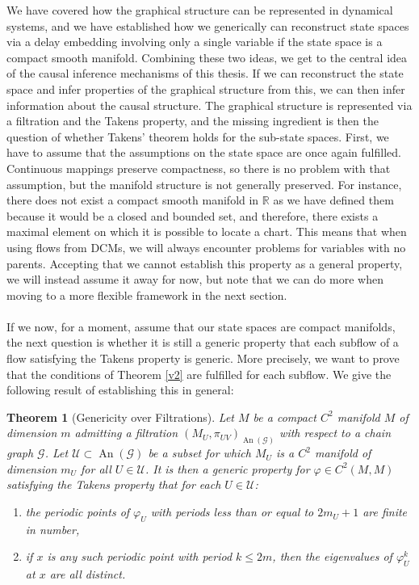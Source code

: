 \documentclass[11pt, a4paper]{memoir}
\theoremstyle{break}
\newtheorem{thm}{Theorem}
\theoremstyle{break}
\theoremstyle{nonumberplain}
\newcommand{\mR}{\mathbb{R}}
\DeclareMathOperator{\an}{An}
\begin{document}
We have covered how the graphical structure can be represented in dynamical systems, and we have established how we generically can reconstruct state spaces via a delay embedding involving only a single variable if the state space is a compact smooth manifold. Combining these two ideas, we get to the central idea of the causal inference mechanisms of this thesis. If we can reconstruct the state space and infer properties of the graphical structure from this, we can then infer information about the causal structure. The graphical structure is represented via a filtration and the Takens property, and the missing ingredient is then the question of whether Takens' theorem holds for the sub-state spaces. First, we have to assume that the assumptions on the state space are once again fulfilled. Continuous mappings preserve compactness, so there is no problem with that assumption, but the manifold structure is not generally preserved. For instance, there does not exist a compact smooth manifold in $\mR$ as we have defined them because it would be a closed and bounded set, and therefore, there exists a maximal element on which it is possible to locate a chart. This means that when using flows from DCMs, we will always encounter problems for variables with no parents. Accepting that we cannot establish this property as a general property, we will instead assume it away for now, but note that we can do more when moving to a more flexible framework in the next section.\\\\
If we now, for a moment, assume that our state spaces are compact manifolds, the next question is whether it is still a generic property that each subflow of a flow satisfying the Takens property is generic. More precisely, we want to prove that the conditions of Theorem \ref{v2} are fulfilled for each subflow. We give the following result of \cite{mathFound} establishing this in general:
\begin{thm}[Genericity over Filtrations]\label{tech}
Let $M$ be a compact $C^2$ manifold $M$ of dimension $m$ admitting a filtration $(M_U,\pi_{UV})_{\an(\mathcal{G})}$ with respect to a chain graph $\mathcal{G}$. Let $\mathcal{U}\subset \an(\mathcal{G})$ be a subset for which $M_U$ is a $C^2$ manifold of dimension $m_U$ for all $U\in \mathcal{U}$. It is then a generic property for $\varphi\in C^2(M,M)$ satisfying the Takens property that for each $U\in \mathcal{U}$: 
\begin{enumerate}[label=(\roman*)]
	\item the periodic points of $\varphi_U$ with periods less than or equal to $2m_U+1$ are finite in number,
	\item if $x$ is any such periodic point with period $k\leqslant 2m$, then the eigenvalues of $\varphi^k_U$ at $x$ are all distinct.
\end{enumerate}
\end{thm}
\end{document}
